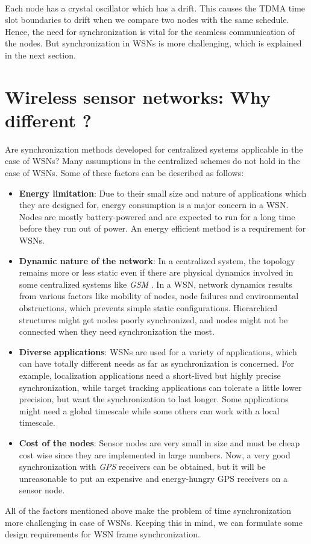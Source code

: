 \documentclass[a4paper,10pt]{report}
\begin{document}
\paragraph*{}
Each node has a crystal oscillator which has a drift. This causes the TDMA time slot boundaries to drift when we compare two nodes with the same schedule. Hence, the need for synchronization is vital for the seamless communication of the nodes. But synchronization in WSNs is more challenging, which is explained in the next section.
\section{\textbf{Wireless sensor networks: Why different ?}}
Are synchronization methods developed for centralized systems applicable in the case of WSNs? Many assumptions in the centralized schemes do not hold in the case of WSNs. Some of these factors can be described as follows:
\begin{itemize}
\item \textbf{Energy limitation}: Due to their small size and nature of applications which they are designed for, energy consumption is a major concern in a WSN. Nodes are mostly battery-powered and are expected to run for a long time before they run out of power. An energy efficient method is a requirement for WSNs.
\item \textbf{Dynamic nature of the network}: In a centralized system, the topology remains more or less static even if there are physical
dynamics involved  in some centralized systems like \textit{GSM} . In a WSN, network dynamics results from various factors like mobility of nodes, node failures and environmental obstructions, which prevents simple static configurations. Hierarchical structures might get nodes poorly synchronized, and nodes might not be connected when they need
synchronization the most.
\item \textbf{Diverse applications}: WSNs are used for a variety of applications, which can have totally different needs as far as synchronization is concerned. For example, localization applications need a short-lived but highly
precise synchronization, while target tracking applications can tolerate a little lower precision, but want the synchronization to
last longer. Some applications might need a global timescale while some others can work with a local timescale.
\item \textbf{Cost of the nodes}: Sensor nodes are very small in size and must be cheap cost wise since they are implemented in large
numbers. Now, a very good synchronization with \textit{GPS} receivers can be obtained, but it will be unreasonable to put an expensive and energy-hungry GPS receivers on a sensor node.
\end{itemize}
All of the factors mentioned above make the problem of time synchronization more challenging in case of WSNs. Keeping this in mind, we can formulate some design requirements for WSN frame synchronization.
\end{document}
